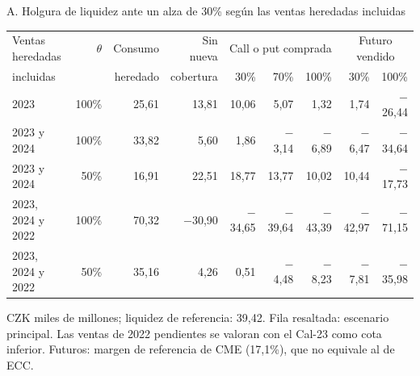 \documentclass[aspectratio=169,11pt]{beamer}
\newcommand{\fuente}[1]{\vfill{\raggedright\tiny\color{cezgray}Fuente: #1\par}}
\begin{document}
\appendix

\begin{frame}[t]{A. Holgura de liquidez ante un alza de 30\% según las ventas heredadas incluidas}
  \centering
  \scriptsize
  \renewcommand{\arraystretch}{1.2}
  \setlength{\tabcolsep}{3.5pt}
  \begin{tabular}{@{}l r r r r r r r r@{}}
    \toprule
    Ventas heredadas & $\theta$ & Consumo & Sin nueva & \multicolumn{3}{c}{Call o put comprada} & \multicolumn{2}{c}{Futuro vendido}\\
    \cmidrule(lr){5-7}\cmidrule(lr){8-9}
    incluidas & & heredado & cobertura & 30\% & 70\% & 100\% & 30\% & 100\%\\ \midrule
    2023 & 100\% & 25,61 & 13,81 & 10,06 & 5,07 & 1,32 & 1,74 & $-$26,44\\
    \rowcolor{cezlight}2023 y 2024 & 100\% & 33,82 & 5,60 & 1,86 & $-$3,14 & $-$6,89 & $-$6,47 & $-$34,64\\
    2023 y 2024 & 50\% & 16,91 & 22,51 & 18,77 & 13,77 & 10,02 & 10,44 & $-$17,73\\
    2023, 2024 y 2022 & 100\% & 70,32 & $-$30,90 & $-$34,65 & $-$39,64 & $-$43,39 & $-$42,97 & $-$71,15\\
    2023, 2024 y 2022 & 50\% & 35,16 & 4,26 & 0,51 & $-$4,48 & $-$8,23 & $-$7,81 & $-$35,98\\
    \bottomrule
  \end{tabular}
  \vspace{3mm}

  \begin{minipage}{0.95\textwidth}\raggedright\scriptsize
  CZK miles de millones; liquidez de referencia: 39,42. Fila resaltada: escenario principal. Las ventas de 2022 pendientes se valoran con el Cal-23 como cota inferior. Futuros: margen de referencia de CME (17,1\%), que no equivale al de ECC.
  \end{minipage}
\end{frame}
\end{document}
